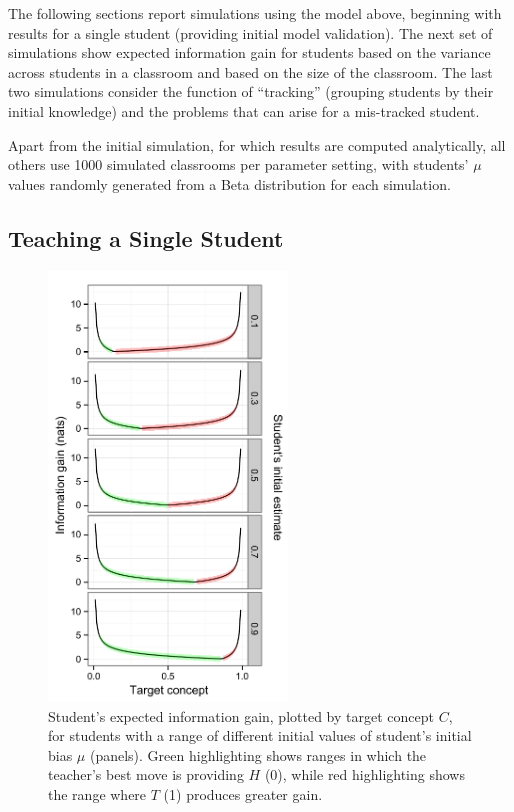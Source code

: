 \documentclass[10pt,letterpaper]{article}
\begin{document}
The following sections report simulations using the model above, beginning with results for a single student (providing initial model validation). The next set of simulations show expected information gain for students based on the variance across students in a classroom and based on the size of the classroom. The last two simulations consider the function of ``tracking'' (grouping students by their initial knowledge) and the problems that can arise for a mis-tracked student. 

Apart from the initial simulation, for which results are computed analytically, all others use 1000 simulated classrooms per parameter setting, with students' $\mu$ values randomly generated from a Beta distribution for each simulation.

\subsection{Teaching a Single Student}

\begin{figure}[t]
\begin{center}
\includegraphics[width=2.5in]{figures/single_student_gain.pdf}
\end{center}
\caption{\label{fig:student} Student's expected information gain, plotted by target concept $C$, for students with a range of different initial values of student's initial bias $\mu$ (panels). Green highlighting shows ranges in which the teacher's best move is providing $H$ (0), while red highlighting shows the range where $T$ (1) produces greater gain.}
\end{figure}
\end{document}
